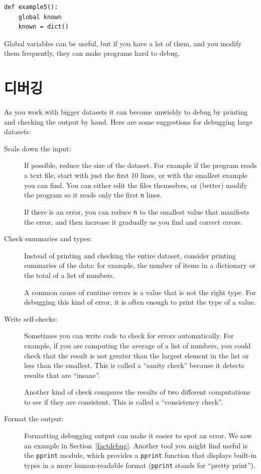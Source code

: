 \documentclass[10pt]{book}
\begin{document}
\begin{verbatim}
def example5():
    global known
    known = dict()
\end{verbatim}
%
Global variables can be useful, but if you have a lot of them,
and you modify them frequently, they can make programs
hard to debug.


\section{디버깅}

As you work with bigger datasets it can become unwieldy to
debug by printing and checking the output by hand.  Here are some
suggestions for debugging large datasets:

\begin{description}

\item[Scale down the input:] If possible, reduce the size of the
dataset.  For example if the program reads a text file, start with
just the first 10 lines, or with the smallest example you can find.
You can either edit the files themselves, or (better) modify the
program so it reads only the first {\tt n} lines.

If there is an error, you can reduce {\tt n} to the smallest
value that manifests the error, and then increase it gradually
as you find and correct errors.

\item[Check summaries and types:] Instead of printing and checking the
entire dataset, consider printing summaries of the data: for example,
the number of items in a dictionary or the total of a list of numbers.

A common cause of runtime errors is a value that is not the right
type.  For debugging this kind of error, it is often enough to print
the type of a value.

\item[Write self-checks:]  Sometimes you can write code to check
for errors automatically.  For example, if you are computing the
average of a list of numbers, you could check that the result is
not greater than the largest element in the list or less than
the smallest.  This is called a ``sanity check'' because it detects
results that are ``insane''.

Another kind of check compares the results of two different
computations to see if they are consistent.  This is called a
``consistency check''.

\item[Format the output:] Formatting debugging output
can make it easier to spot an error.  We saw an example in
Section~\ref{factdebug}.  Another tool you might find useful is the {\tt pprint} module, which provides
a {\tt pprint} function that displays built-in types in
a more human-readable format ({\tt pprint} stands for
``pretty print'').

\end{description}
\end{document}
